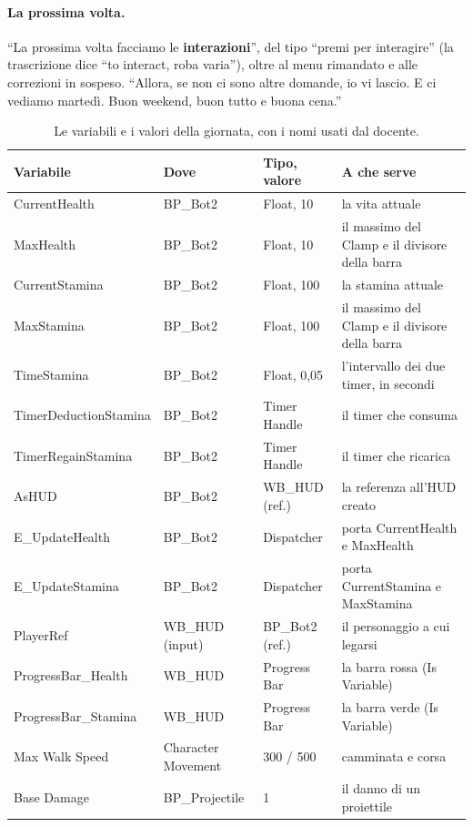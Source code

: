\paragraph{La prossima volta.} ``La prossima volta facciamo le \textbf{interazioni}'', del
tipo ``premi per interagire'' (la trascrizione dice ``to interact, roba varia''), oltre al
menu rimandato e alle correzioni in sospeso. ``Allora, se non ci sono altre domande, io vi
lascio. E ci vediamo martedì. Buon weekend, buon tutto e buona cena.''

\begin{table}[htbp]
\centering
\small
\begin{tabular}{@{}p{3.6cm}p{2.6cm}p{2.0cm}p{5.8cm}@{}}
\toprule
\textbf{Variabile} & \textbf{Dove} & \textbf{Tipo, valore} & \textbf{A che serve} \\
\midrule
CurrentHealth & BP\_Bot2 & Float, 10 & la vita attuale \\
MaxHealth & BP\_Bot2 & Float, 10 & il massimo del Clamp e il divisore della barra \\
CurrentStamina & BP\_Bot2 & Float, 100 & la stamina attuale \\
MaxStamina & BP\_Bot2 & Float, 100 & il massimo del Clamp e il divisore della barra \\
TimeStamina & BP\_Bot2 & Float, 0,05 & l'intervallo dei due timer, in secondi \\
TimerDeductionStamina & BP\_Bot2 & Timer Handle & il timer che consuma \\
TimerRegainStamina & BP\_Bot2 & Timer Handle & il timer che ricarica \\
AsHUD & BP\_Bot2 & WB\_HUD (ref.) & la referenza all'HUD creato \\
E\_UpdateHealth & BP\_Bot2 & Dispatcher & porta CurrentHealth e MaxHealth \\
E\_UpdateStamina & BP\_Bot2 & Dispatcher & porta CurrentStamina e MaxStamina \\
PlayerRef & WB\_HUD (input) & BP\_Bot2 (ref.) & il personaggio a cui legarsi \\
ProgressBar\_Health & WB\_HUD & Progress Bar & la barra rossa (Is Variable) \\
ProgressBar\_Stamina & WB\_HUD & Progress Bar & la barra verde (Is Variable) \\
Max Walk Speed & Character Movement & 300 / 500 & camminata e corsa \\
Base Damage & BP\_Projectile & 1 & il danno di un proiettile \\
\bottomrule
\end{tabular}
\caption{Le variabili e i valori della giornata, con i nomi usati dal docente.}
\label{ue11:tab:variabili}
\end{table}

